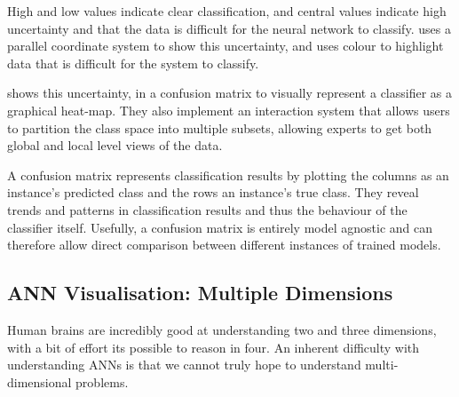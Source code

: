 \documentclass[a4paper,11pt,titlepage]{article}
\begin{document}
	 	\par 
		 High and low values indicate clear classification, and central values indicate high uncertainty and that the data is difficult for the neural network to classify. \cite{Tzeng2005} uses a parallel coordinate system to show this uncertainty, and uses colour to highlight data that is difficult for the system to classify.
		\par 
		\cite{Talbot2009} shows this uncertainty, in a confusion matrix to visually represent a classifier as a graphical heat-map. They also implement an interaction system that allows users to partition the class space into multiple subsets, allowing experts to get both global and local level views of the data.
 		 
 		 \begin{figure}[H]
    			\centering	
    			\qquad
    			\caption{ }%
    			\label{fig:studentprofile}
		\end{figure}
		
		
		\par 
		A confusion matrix represents classification results by plotting the columns as an instance's predicted class and the rows an instance's true class. They reveal trends and patterns in classification results and thus the behaviour of the classifier itself. Usefully, a confusion matrix is entirely model agnostic and can therefore allow direct comparison between different instances of trained models.
		
	\subsection{ANN Visualisation: Multiple Dimensions}
	Human brains are incredibly good at understanding two and three dimensions, with a bit of effort its possible to reason in four. An inherent difficulty with understanding ANNs is that we cannot truly hope to understand multi-dimensional problems.
\end{document}

